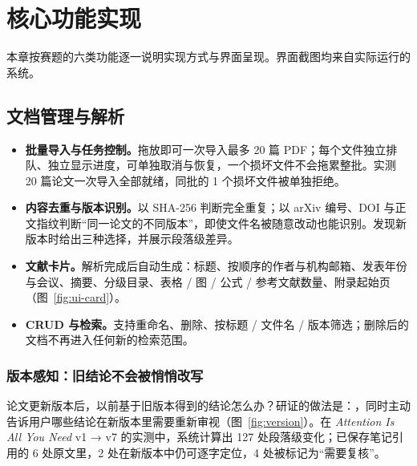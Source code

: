 \clearpage
\section{核心功能实现}\label{sec:features}

本章按赛题的六类功能逐一说明实现方式与界面呈现。界面截图均来自实际运行的系统。

\subsection{文档管理与解析}

\noindent
\begin{minipage}[t]{0.665\linewidth}\vspace{0pt}
  \label{fig:ui-library}
\end{minipage}\hfill
\begin{minipage}[t]{0.3\linewidth}\vspace{0pt}
  \label{fig:ui-card}
\end{minipage}

\vspace{4pt}
\begin{itemize}
  \item \textbf{批量导入与任务控制。}拖放即可一次导入最多 20 篇 PDF；每个文件独立排队、独立显示进度，可单独取消与恢复，一个损坏文件不会拖累整批。实测 20 篇论文一次导入全部就绪，同批的 1 个损坏文件被单独拒绝。
  \item \textbf{内容去重与版本识别。}以 SHA-256 判断完全重复；以 arXiv 编号、DOI 与正文指纹判断“同一论文的不同版本”，即使文件名被随意改动也能识别。发现新版本时给出三种选择，并展示段落级差异。
  \item \textbf{文献卡片。}解析完成后自动生成：标题、按顺序的作者与机构邮箱、发表年份与会议、摘要、分级目录、表格 / 图 / 公式 / 参考文献数量、附录起始页（图~\ref{fig:ui-card}）。
  \item \textbf{CRUD 与检索。}支持重命名、删除、按标题 / 文件名 / 版本筛选；删除后的文档不再进入任何新的检索范围。
\end{itemize}

\subsubsection{版本感知：旧结论不会被悄悄改写}

论文更新版本后，以前基于旧版本得到的结论怎么办？研证的做法是：，同时主动告诉用户哪些结论在新版本里需要重新审视（图~\ref{fig:version}）。在 \emph{Attention Is All You Need} v1 → v7 的实测中，系统计算出 127 处段落级变化；已保存笔记引用的 6 处原文里，2 处在新版本中仍可逐字定位，4 处被标记为“需要复核”。

